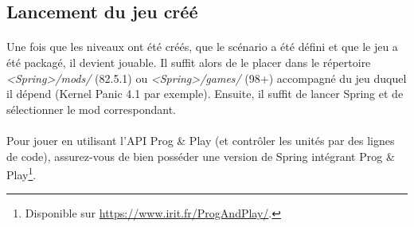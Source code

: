 \documentclass[a4paper]{article}
\begin{document}
\subsection{Lancement du jeu créé}
\paragraph{ }
Une fois que les niveaux ont été créés, que le scénario a été défini et que le jeu a été packagé, il devient jouable. Il suffit alors de le placer dans le répertoire \textit{<Spring>/mods/} (82.5.1) ou \textit{<Spring>/games/} (98+) accompagné du jeu duquel il dépend (Kernel Panic 4.1 par exemple). Ensuite, il suffit de lancer Spring et de sélectionner le mod correspondant.
\paragraph{ }
Pour jouer en utilisant l'API Prog \& Play (et contrôler les unités par des lignes de code), assurez-vous de bien posséder une version de Spring intégrant Prog \& Play\footnote{Disponible sur \url{https://www.irit.fr/ProgAndPlay/}.}.
\end{document}
